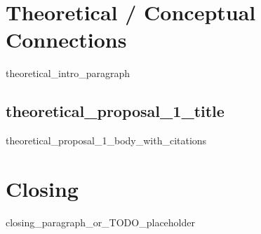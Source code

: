 \documentclass[11pt]{article}
\begin{document}
\section*{Theoretical / Conceptual Connections}

{{theoretical_intro_paragraph}}

\subsection*{ {{theoretical_proposal_1_title}} }
{{theoretical_proposal_1_body_with_citations}}

\section*{Closing}

{{closing_paragraph_or_TODO_placeholder}}



\end{document}
